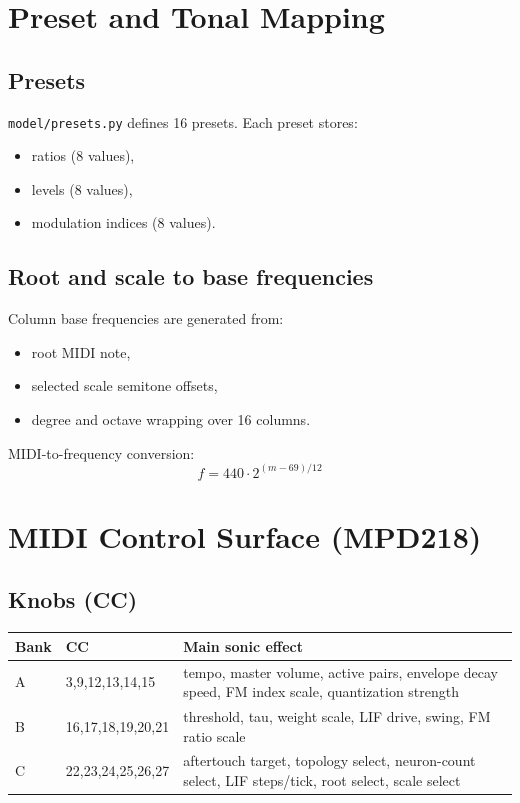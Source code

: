 \documentclass[11pt,a4paper]{article}
\begin{document}
\section{Preset and Tonal Mapping}
\subsection{Presets}
\texttt{model/presets.py} defines 16 presets. Each preset stores:
\begin{itemize}
    \item ratios (8 values),
    \item levels (8 values),
    \item modulation indices (8 values).
\end{itemize}

\subsection{Root and scale to base frequencies}
Column base frequencies are generated from:
\begin{itemize}
    \item root MIDI note,
    \item selected scale semitone offsets,
    \item degree and octave wrapping over 16 columns.
\end{itemize}

MIDI-to-frequency conversion:
\begin{equation}
f = 440 \cdot 2^{(m-69)/12}
\end{equation}

\section{MIDI Control Surface (MPD218)}
\subsection{Knobs (CC)}
\begin{center}
\begin{tabular}{>{\raggedright\arraybackslash}p{1.4cm}p{1.2cm}p{7.6cm}}
\toprule
Bank & CC & Main sonic effect \\
\midrule
A & 3,9,12,13,14,15 & tempo, master volume, active pairs, envelope decay speed, FM index scale, quantization strength \\
B & 16,17,18,19,20,21 & threshold, tau, weight scale, LIF drive, swing, FM ratio scale \\
C & 22,23,24,25,26,27 & aftertouch target, topology select, neuron-count select, LIF steps/tick, root select, scale select \\
\bottomrule
\end{tabular}
\end{center}
\end{document}
